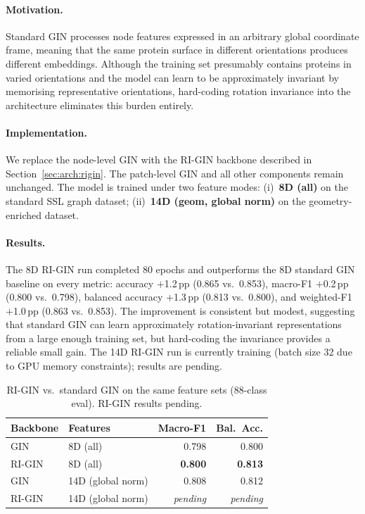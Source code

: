 \paragraph{Motivation.}
Standard GIN processes node features expressed in an arbitrary global
coordinate frame, meaning that the same protein surface in different
orientations produces different embeddings.
Although the training set presumably contains proteins in varied orientations
and the model can learn to be approximately invariant by memorising
representative orientations, hard-coding rotation invariance into the
architecture eliminates this burden entirely.

\paragraph{Implementation.}
We replace the node-level GIN with the RI-GIN backbone described in
Section~\ref{sec:arch:rigin}.
The patch-level GIN and all other components remain unchanged.
The model is trained under two feature modes:
(i)~\textbf{8D (all)} on the standard SSL graph dataset;
(ii)~\textbf{14D (geom, global norm)} on the geometry-enriched dataset.

\paragraph{Results.}
The 8D RI-GIN run completed 80 epochs and outperforms the 8D standard GIN
baseline on every metric: accuracy $+$1.2\,pp (0.865 vs.\ 0.853),
macro-F1 $+$0.2\,pp (0.800 vs.\ 0.798), balanced accuracy $+$1.3\,pp
(0.813 vs.\ 0.800), and weighted-F1 $+$1.0\,pp (0.863 vs.\ 0.853).
The improvement is consistent but modest, suggesting that standard GIN can
learn approximately rotation-invariant representations from a large enough
training set, but hard-coding the invariance provides a reliable small gain.
The 14D RI-GIN run is currently training (batch size 32 due to GPU memory
constraints); results are pending.

\begin{table}[h]
  \centering
  \caption{RI-GIN vs.\ standard GIN on the same feature sets (88-class eval).
           RI-GIN results pending.}
  \label{tab:rigin}
  \begin{tabular}{llrr}
    \toprule
    \textbf{Backbone} & \textbf{Features} & \textbf{Macro-F1} & \textbf{Bal.\ Acc.} \\
    \midrule
    GIN    & 8D (all)             & 0.798 & 0.800 \\
    RI-GIN & 8D (all)             & \textbf{0.800} & \textbf{0.813} \\
    \midrule
    GIN    & 14D (global norm)    & 0.808 & 0.812 \\
    RI-GIN & 14D (global norm)    & \textit{pending} & \textit{pending} \\
    \bottomrule
  \end{tabular}
\end{table}

